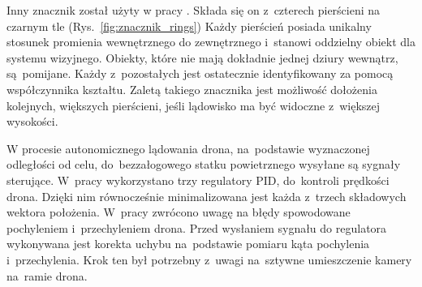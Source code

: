 Inny znacznik został użyty w pracy \cite{Rings}. 
Składa się on z~czterech pierścieni na czarnym tle (Rys.~\ref{fig:znacznik_rings})
Każdy pierścień posiada unikalny stosunek promienia wewnętrznego do zewnętrznego i~stanowi oddzielny obiekt dla systemu wizyjnego. 
Obiekty, które nie mają dokładnie jednej dziury wewnątrz, są~pomijane. 
Każdy z~pozostałych jest ostatecznie identyfikowany za pomocą współczynnika kształtu. 
Zaletą takiego znacznika jest możliwość dołożenia kolejnych, większych pierścieni, jeśli lądowisko ma być widoczne z~większej wysokości.\par %


W procesie autonomicznego lądowania drona, na~podstawie wyznaczonej odległości od celu, do~bezzałogowego statku powietrznego wysyłane są sygnały sterujące. 
W~pracy \cite{Sudevan} wykorzystano trzy regulatory PID, do~kontroli prędkości drona. 
Dzięki nim równocześnie minimalizowana jest każda z~trzech składowych wektora położenia. %
W~pracy \cite{Rings} zwrócono uwagę na błędy spowodowane pochyleniem i~przechyleniem drona. 
Przed wysłaniem sygnału do regulatora wykonywana jest korekta uchybu na~podstawie pomiaru kąta pochylenia i~przechylenia. Krok ten był potrzebny z~uwagi na~sztywne umieszczenie kamery na~ramie drona. \par %

